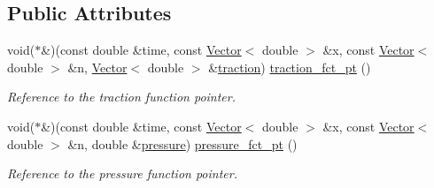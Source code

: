 \subsection*{Public Attributes}
\begin{DoxyCompactItemize}
\item 
void($\ast$\&)(const double \&time, const \hyperlink{classoomph_1_1Vector}{Vector}$<$ double $>$ \&x, const \hyperlink{classoomph_1_1Vector}{Vector}$<$ double $>$ \&n, \hyperlink{classoomph_1_1Vector}{Vector}$<$ double $>$ \&\hyperlink{classoomph_1_1PoroelasticityFaceElement_a1e82041ba48cda7bc31aa65165cf8208}{traction}) \hyperlink{classoomph_1_1PoroelasticityFaceElement_a50f847881ebe385a49e7e31bf2e84985}{traction\+\_\+fct\+\_\+pt} ()
\begin{DoxyCompactList}\small\item\em Reference to the traction function pointer. \end{DoxyCompactList}\item 
void($\ast$\&)(const double \&time, const \hyperlink{classoomph_1_1Vector}{Vector}$<$ double $>$ \&x, const \hyperlink{classoomph_1_1Vector}{Vector}$<$ double $>$ \&n, double \&\hyperlink{classoomph_1_1PoroelasticityFaceElement_af0ecc8b5c372d479f9ba46892a21e955}{pressure}) \hyperlink{classoomph_1_1PoroelasticityFaceElement_af2e65648f0bd2ebcdef444d47bad6861}{pressure\+\_\+fct\+\_\+pt} ()
\begin{DoxyCompactList}\small\item\em Reference to the pressure function pointer. \end{DoxyCompactList}\end{DoxyCompactItemize}
